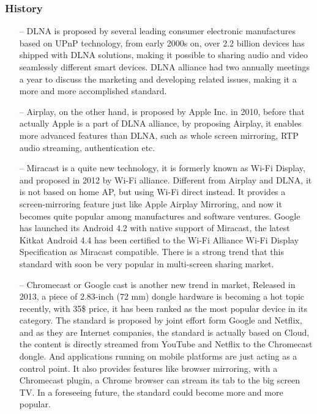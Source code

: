 \subsubsection{History}
\begin{itemize}
\item[--]DLNA is proposed by several leading consumer electronic manufactures based on UPnP 
technology, from early 2000s on, over 2.2 billion devices has shipped with DLNA solutions, 
making it possible to sharing audio and video seamlessly different smart devices. DLNA alliance 
had two annually meetings a year to discuss the marketing and developing related issues, making 
it a more and more accomplished standard.

\item[--]Airplay, on the other hand, is proposed by Apple Inc. in 2010, before that actually 
Apple is a part of DLNA alliance, by proposing Airplay, it enables more advanced features than 
DLNA, such as whole screen mirroring, RTP audio streaming, authentication etc.
\item[--]Miracast is a quite new technology, it is formerly known as Wi-Fi Display, and proposed 
in 2012 by Wi-Fi alliance. Different from Airplay and DLNA, it is not based on home AP, but using 
Wi-Fi direct instead. It provides a screen-mirroring feature just like Apple Airplay Mirroring, 
and now it becomes quite popular among manufactures and software ventures. Google has launched 
its Android 4.2 with native support of Miracast, the latest Kitkat Android 4.4 has been certified 
to the Wi-Fi Alliance Wi-Fi Display Specification as Miracast compatible. There is a strong trend 
that this standard with soon be very popular in multi-screen sharing market.
\item[--]Chromecast or Google cast is another new trend in market, Released in 2013, a piece of 
2.83-inch (72 mm) dongle hardware is becoming a hot topic recently, with 35\$ price, it has been 
ranked as the most popular device in its category. The standard is proposed by joint effort form 
Google and Netflix, and as they are Internet companies, the standard is actually based on Cloud, 
the content is directly streamed from YouTube and Netflix to the Chromecast dongle. And applications 
running on mobile platforms are just acting as a control point. It also provides features like 
browser mirroring, with a Chromecast plugin, a Chrome browser can stream its tab to the big screen 
TV. In a foreseeing future, the standard could become more and more popular.
\end{itemize}
